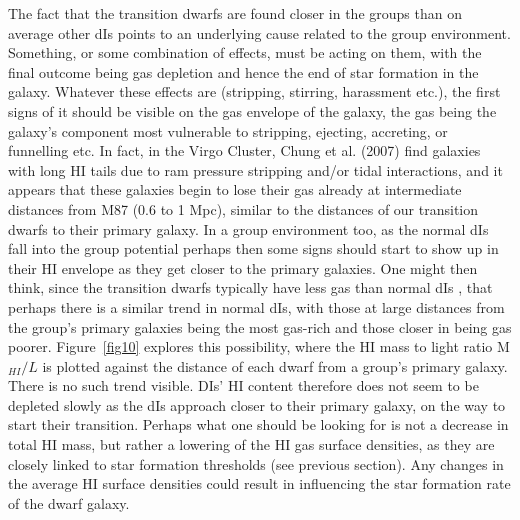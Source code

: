 \documentclass[preprint]{aastex}
\begin{document}
The fact that the transition dwarfs are found closer in the groups than
on average other dIs points to an underlying cause related to the
group environment. Something, or some combination of effects, must be
acting on them, with the final outcome being gas depletion and hence
the end of star formation in the galaxy. 
Whatever these effects are (stripping, stirring, harassment etc.),
the first signs of it should be visible on the gas envelope of the
galaxy, the gas being the galaxy's component most vulnerable to
stripping, ejecting, accreting, or funnelling etc. In fact, in the Virgo Cluster, 
Chung et al. (2007) find galaxies with long HI tails 
due to ram pressure stripping
and/or tidal interactions, and it appears that these galaxies begin to lose
their gas already at intermediate distances from M87 (0.6 to 1 Mpc),
similar to the distances of our transition dwarfs to their primary galaxy.  
In a group environment too, as the normal dIs
fall into the group potential perhaps then some signs should start
to show up in their HI envelope as they get closer to the primary galaxies.
One might then think, since the transition dwarfs typically have less gas
than normal dIs \citet{s96}, that perhaps there is a similar trend in normal dIs,
with those at large distances from the group's primary galaxies being 
the most gas-rich and those closer in being gas poorer. Figure~\ref{fig10}
explores this possibility, where the HI mass to light ratio M$_{HI}/L$ is plotted
against the distance of each dwarf from a group's primary galaxy.
There is no such trend visible.
DIs' HI content therefore does not seem  to be depleted
slowly as the dIs approach closer to their primary galaxy, on the way 
to start their transition.  Perhaps what one should be looking for is not
a decrease in total HI mass, but rather a lowering of the HI gas
surface densities, as they are closely linked to star formation thresholds
(see previous section). Any changes in the average HI surface densities
could result in influencing the star formation rate of the dwarf galaxy.
\end{document}
